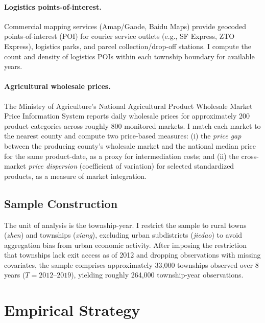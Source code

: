 \documentclass[12pt]{article}
\begin{document}
\paragraph{Logistics points-of-interest.} Commercial mapping services (Amap/Gaode, Baidu Maps) provide geocoded points-of-interest (POI) for courier service outlets (e.g., SF Express, ZTO Express), logistics parks, and parcel collection/drop-off stations. I compute the count and density of logistics POIs within each township boundary for available years.

\paragraph{Agricultural wholesale prices.} The Ministry of Agriculture's National Agricultural Product Wholesale Market Price Information System reports daily wholesale prices for approximately 200 product categories across roughly 800 monitored markets. I match each market to the nearest county and compute two price-based measures: (i) the \textit{price gap} between the producing county's wholesale market and the national median price for the same product-date, as a proxy for intermediation costs; and (ii) the cross-market \textit{price dispersion} (coefficient of variation) for selected standardized products, as a measure of market integration.

\subsection{Sample Construction}

The unit of analysis is the township-year. I restrict the sample to rural towns (\textit{zhen}) and townships (\textit{xiang}), excluding urban subdistricts (\textit{jiedao}) to avoid aggregation bias from urban economic activity. After imposing the restriction that townships lack exit access as of 2012 and dropping observations with missing covariates, the sample comprises approximately 33,000 townships observed over 8 years ($T = 2012$--$2019$), yielding roughly 264,000 township-year observations.


\section{Empirical Strategy}\label{sec:identification}
\end{document}
